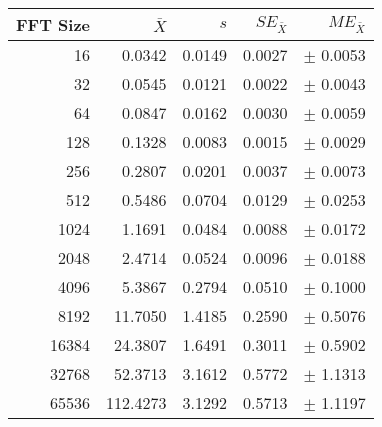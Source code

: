 \begin{tabular}{|r|r|r|r|r|}\hline
    FFT Size & $\bar{X}$ & $s$ & $SE_{\bar{X}}$ & $ME_{\bar{X}}$ \\ \hline
    16 & 0.0342 & 0.0149 & 0.0027 & $\pm$ 0.0053 \\ \hline
    32 & 0.0545 & 0.0121 & 0.0022 & $\pm$ 0.0043 \\ \hline
    64 & 0.0847 & 0.0162 & 0.0030 & $\pm$ 0.0059 \\ \hline
    128 & 0.1328 & 0.0083 & 0.0015 & $\pm$ 0.0029 \\ \hline
    256 & 0.2807 & 0.0201 & 0.0037 & $\pm$ 0.0073 \\ \hline
    512 & 0.5486 & 0.0704 & 0.0129 & $\pm$ 0.0253 \\ \hline
    1024 & 1.1691 & 0.0484 & 0.0088 & $\pm$ 0.0172 \\ \hline
    2048 & 2.4714 & 0.0524 & 0.0096 & $\pm$ 0.0188 \\ \hline
    4096 & 5.3867 & 0.2794 & 0.0510 & $\pm$ 0.1000 \\ \hline
    8192 & 11.7050 & 1.4185 & 0.2590 & $\pm$ 0.5076 \\ \hline
    16384 & 24.3807 & 1.6491 & 0.3011 & $\pm$ 0.5902 \\ \hline
    32768 & 52.3713 & 3.1612 & 0.5772 & $\pm$ 1.1313 \\ \hline
    65536 & 112.4273 & 3.1292 & 0.5713 & $\pm$ 1.1197 \\ \hline
\end{tabular}
